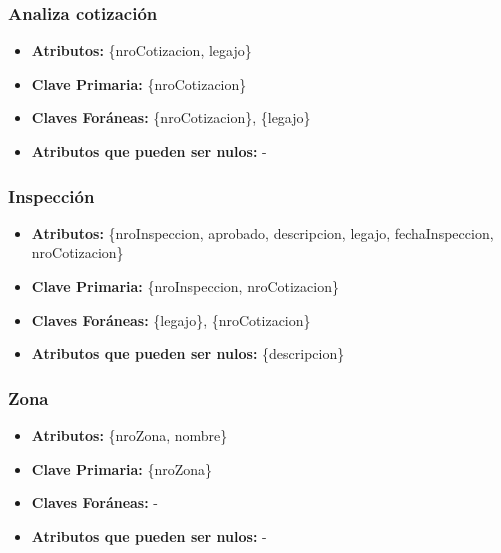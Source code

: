 \documentclass[a4paper,11pt]{article}
\begin{document}
\subsubsection{Analiza cotización}

\begin{itemize}

	\item \textbf{Atributos:} \{nroCotizacion, legajo\}
	
	\item \textbf{Clave Primaria:} \{nroCotizacion\}
	
	\item \textbf{Claves Foráneas:} \{nroCotizacion\}, \{legajo\}

	\item \textbf{Atributos que pueden ser nulos:} -
	
\end{itemize}

\subsubsection{Inspección}

\begin{itemize}

	\item \textbf{Atributos:} \{nroInspeccion, aprobado, descripcion, legajo, fechaInspeccion, nroCotizacion\}
	
	\item \textbf{Clave Primaria:} \{nroInspeccion, nroCotizacion\}
	
	\item \textbf{Claves Foráneas:} \{legajo\}, \{nroCotizacion\}

	\item \textbf{Atributos que pueden ser nulos:} \{descripcion\}
	
\end{itemize}

\subsubsection{Zona}

\begin{itemize}

	\item \textbf{Atributos:} \{nroZona, nombre\}
	
	\item \textbf{Clave Primaria:} \{nroZona\}
	
	\item \textbf{Claves Foráneas:} -

	\item \textbf{Atributos que pueden ser nulos:} -
	
\end{itemize}
\end{document}
